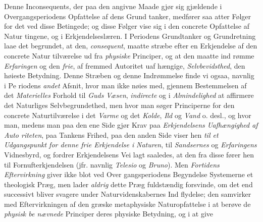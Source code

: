 Denne Inconsequents, der paa den angivne Maade gjør
sig gjældende i Overgangsperiodens Opfattelse af dens Grund\-%
tanker, medfører saa atter Følger for det ved disse Betingede;
og disse Følger vise sig i den concrete Opfattelse af Natur\-%
tingene, og i Erkjendelseslæren. I Periodens Grundtanker og
Grundretning laae det begrundet, at den, \emph{consequent},
maatte stræbe efter en Erkjendelse af den concrete Natur\-%
tilværelse ud fra \emph{physiske} Principer, og at den maatte ind\-%
rømme \emph{Erfaringen} og den \emph{frie}, af fremmed Autoritet uaf\-%
hængige, \emph{Selvbevidsthed}, den høieste Betydning. Denne
Stræben og denne Indrømmelse finde vi ogsaa, navnlig i Pe\-%
riodens \emph{andet} Afsnit, hvor man ikke nøies med, gjennem
Bestemmelsen af det \emph{Materielles} Forhold til \emph{Guds Væsen},
\emph{indirecte} og i \emph{Almindelighed} at affirmere det Naturliges
Selvbegrundethed, men hvor man søger Principerne for den
concrete Naturtilværelse i det \emph{Varme} og det \emph{Kolde}, \emph{Ild} og
\emph{Vand} o. desl., og hvor man, medens man paa den ene Side
gjør Krav paa \emph{Erkjendelsens Uafhængighed af Auto\-%
riteten}, paa Tankens Frihed, paa den anden Side viser hen
\emph{til et Udgangspunkt for denne frie Erkjendelse i}
 \setcounter{footnote}{0}
\emph{Naturen}, til \emph{Sandsernes} og \emph{Erfaringens} Vidnesbyrd, og
fordrer Erkjendelsens Vei lagt saaledes, at den fra disse fører
hen til Fornufterkjendelsen (jfr. navnlig \emph{Telesio} og \emph{Bruno}).
Men \emph{Fortidens Eftervirkning} giver ikke blot ved Over\-%
gangsperiodens Begyndelse Systemerne et theologisk Præg,
men lader \emph{aldrig} dette Præg fuldstændig forsvinde, om det
end successivt bliver svagere under Naturvidenskabernes Ind\-%
flydelse; den samvirker med Eftervirkningen af den græske
metaphysiske Naturopfattelse i at berøve de \emph{physisk be\-%
nævnede} Principer deres physiske Betydning, og i at give
